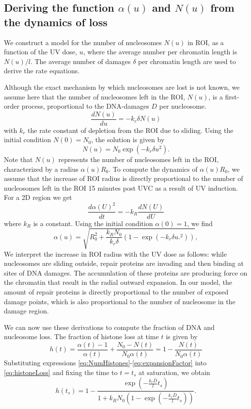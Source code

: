 \documentclass[12pt]{article}
\begin{document}
\subsection{Deriving the function $\alpha(u)$ and $N(u)$ from the dynamics of loss}
We construct a model for the number of nucleosomes $N(u)$ in ROI, as a function of the UV dose, $u$,  where the average number per chromatin length is $N(u)/l$. The average number of damages $\delta$ per chromatin length are used to derive the rate equations.

Although the exact mechanism by which nucleosomes are lost is not known, we assume here that the number of nucleosomes left in the ROI, $N(u)$, is a first-order process, proportional to the DNA-damages $D$ per nucleosome.
\begin{equation*}
\frac{dN(u)}{du} = -k_r\delta N(u)
\end{equation*}
with $k_r$ the rate constant of depletion from the ROI due to sliding. Using the initial condition $N(0) = N_0$, the solution is given by
\begin{equation}\label{eq:NumHistones}
N(u) = N_0\exp(-k_r\delta u^2).
\end{equation}
Note that $N(u)$ represents the number of nucleosomes left in the ROI, characterized by a radius $\alpha(u)R_0$. To compute the dynamics of $\alpha(u)R_0$, we assume that the increase of ROI radius is directly proportional to the number of nucleosomes left in the ROI 15 minutes post UVC as a result of UV induction. For a 2D region we get 
\begin{equation}\label{dralpha}
\frac{d\alpha(U)^2}{dt}=-k_R\frac{dN(U)}{dU}
\end{equation}
where $k_R$ is a constant. Using the initial condition $\alpha(0)= 1$, we find 
\begin{equation}\label{eq:expansionFactor}
\alpha(u) = \sqrt{R_0^2 + \frac{k_RN_0}{k_r\delta}\left(1-\exp(-k_r\delta u.^2)\right)},
\end{equation}
We interpret the increase in ROI radius with the UV dose as follows: while nucleosomes are sliding outside, repair proteins are invading and then binding at sites of DNA damages. The accumulation of these proteins are producing force on the chromatin that result in the radial outward expansion. In our model, the amount of repair proteins is directly proportional to the number of exposed damage points, which is also proportional to the number of nucleosome in the damage region.

We can now use these derivations to compute the fraction of DNA and nucleosome loss. The fraction of histone loss at time $t$ is given by
\begin{equation}\label{eq:histoneLoss}
h(t) = \frac{\alpha(t)-1}{\alpha(t)} +\frac{N_0-N(t)}{N_0\alpha(t)}=1-\frac{N(t)}{N_0\alpha(t)}
\end{equation}
Substituting expressions \ref{eq:NumHistones}-\ref{eq:expansionFactor} into \ref{eq:histoneLoss} and fixing the time to $t=t_s$ at saturation, we obtain
\begin{equation}\label{eq:totalHistoneLoss}
h(t_s)=1-\frac{\exp(-\frac{k_r\bar{D}}{l}t_s)}{ 1+k_RN_0(1-\exp(-\frac{k_r\bar{D}}{l}t_s))}.
\end{equation}
\end{document}
